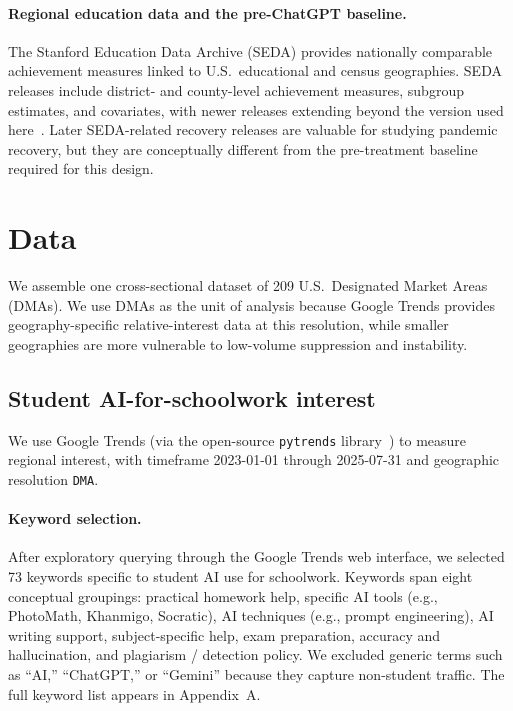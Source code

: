 \documentclass[11pt]{article}
\begin{document}
\paragraph{Regional education data and the pre-ChatGPT baseline.}
The Stanford Education Data Archive (SEDA) provides nationally comparable achievement measures linked to U.S.\ educational and census geographies. SEDA releases include district- and county-level achievement measures, subgroup estimates, and covariates, with newer releases extending beyond the version used here~\citep{reardon2025}. Later SEDA-related recovery releases are valuable for studying pandemic recovery, but they are conceptually different from the pre-treatment baseline required for this design.

\section{Data}
\label{sec:data}

We assemble one cross-sectional dataset of 209 U.S.\ Designated Market Areas (DMAs). We use DMAs as the unit of analysis because Google Trends provides geography-specific relative-interest data at this resolution, while smaller geographies are more vulnerable to low-volume suppression and instability.

\subsection{Student AI-for-schoolwork interest}

We use Google Trends (via the open-source \texttt{pytrends} library~\citep{pytrends2023}) to measure regional interest, with timeframe 2023-01-01 through 2025-07-31 and geographic resolution \texttt{DMA}.

\paragraph{Keyword selection.}
After exploratory querying through the Google Trends web interface, we selected 73 keywords specific to student AI use for schoolwork. Keywords span eight conceptual groupings: practical homework help, specific AI tools (e.g., PhotoMath, Khanmigo, Socratic), AI techniques (e.g., prompt engineering), AI writing support, subject-specific help, exam preparation, accuracy and hallucination, and plagiarism / detection policy. We excluded generic terms such as ``AI,'' ``ChatGPT,'' or ``Gemini'' because they capture non-student traffic. The full keyword list appears in Appendix~A.
\end{document}
